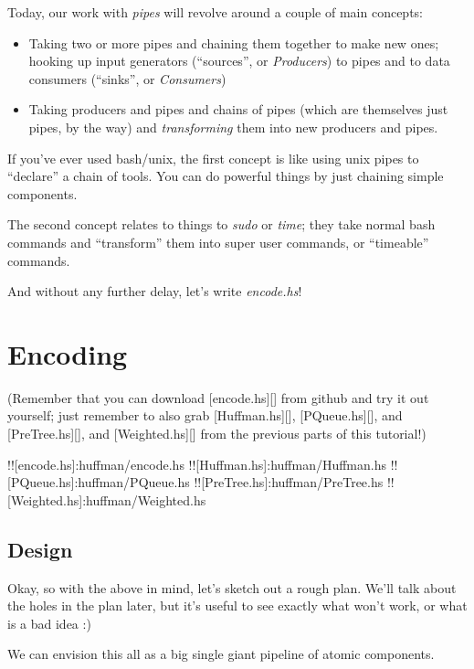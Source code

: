 \documentclass[]{article}
\begin{document}
Today, our work with \emph{pipes} will revolve around a couple of main
concepts:

\begin{itemize}
\item
  Taking two or more pipes and chaining them together to make new ones;
  hooking up input generators (``sources'', or \emph{Producers}) to
  pipes and to data consumers (``sinks'', or \emph{Consumers})
\item
  Taking producers and pipes and chains of pipes (which are themselves
  just pipes, by the way) and \emph{transforming} them into new
  producers and pipes.
\end{itemize}

If you've ever used bash/unix, the first concept is like using unix
pipes to ``declare'' a chain of tools. You can do powerful things by
just chaining simple components.

The second concept relates to things to \emph{sudo} or \emph{time}; they
take normal bash commands and ``transform'' them into super user
commands, or ``timeable'' commands.

And without any further delay, let's write \emph{encode.hs}!

\section{Encoding}\label{encoding}

(Remember that you can download {[}encode.hs{]}{[}{]} from github and
try it out yourself; just remember to also grab {[}Huffman.hs{]}{[}{]},
{[}PQueue.hs{]}{[}{]}, and {[}PreTree.hs{]}{[}{]}, and
{[}Weighted.hs{]}{[}{]} from the previous parts of this tutorial!)

!!{[}encode.hs{]}:huffman/encode.hs
!!{[}Huffman.hs{]}:huffman/Huffman.hs
!!{[}PQueue.hs{]}:huffman/PQueue.hs
!!{[}PreTree.hs{]}:huffman/PreTree.hs
!!{[}Weighted.hs{]}:huffman/Weighted.hs

\subsection{Design}\label{design}

Okay, so with the above in mind, let's sketch out a rough plan. We'll
talk about the holes in the plan later, but it's useful to see exactly
what won't work, or what is a bad idea :)

We can envision this all as a big single giant pipeline of atomic
components.
\end{document}
